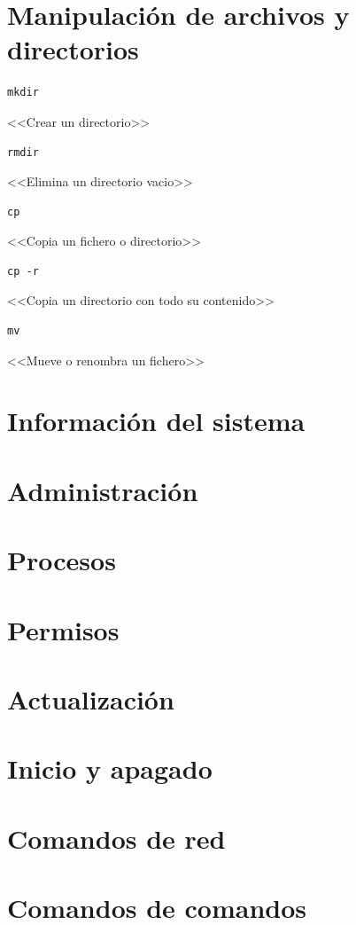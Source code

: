\documentclass[a4paper, 10pt, titlepage]{report}
\begin{document}
\section{Manipulación de archivos y directorios}

\begin{verbatim}
mkdir
\end{verbatim}    
<<Crear un directorio>>


\begin{verbatim}
rmdir
\end{verbatim}
<<Elimina un directorio vacio>>

\begin{verbatim}
cp
\end{verbatim}
<<Copia un fichero o directorio>>

\begin{verbatim}
cp -r
\end{verbatim}
<<Copia un directorio con todo su contenido>>

\begin{verbatim}
mv
\end{verbatim}
<<Mueve o renombra un fichero>>

\section{Información del sistema}
\section{Administración}
\section{Procesos}
\section{Permisos}
\section{Actualización}
\section{Inicio y apagado}
\section{Comandos de red}
\section{Comandos de comandos}
\end{document}
